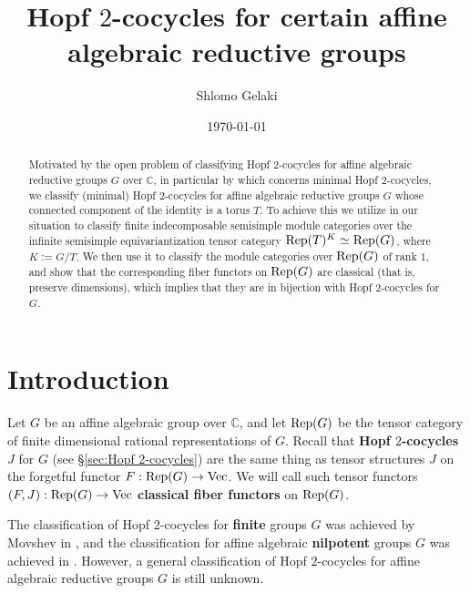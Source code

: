 \documentclass{amsart}
\theoremstyle{definition}
\newcommand{\Rep}{{\rm Rep}}
\newcommand{\Vect}{{\rm Vec}}
\numberwithin{equation}{section}
\begin{document}
\title[Hopf $2$-cocycles for certain affine algebraic reductive groups] {Hopf $2$-cocycles for certain affine algebraic reductive groups}

\author{Shlomo Gelaki}
\address{Department of Mathematics, Iowa State University, Ames, IA 50011, USA} 

\date{\today}


\begin{abstract}
Motivated by the open problem of classifying Hopf $2$-cocycles for affine algebraic reductive groups $G$ over $\mathbb{C}$, in particular by \cite[Question 7.2]{EG1} which concerns minimal Hopf $2$-cocycles, we classify (minimal) Hopf $2$-cocycles for affine algebraic reductive groups $G$ whose connected component of the identity is a torus $T$. To achieve this we utilize \cite[Proposition 5.4]{ENO} in our situation to classify finite indecomposable semisimple module categories over the infinite semisimple equivariantization tensor category $\Rep(T)^K\simeq \Rep(G)$, where $K:=G/T$. We then use it to classify the module categories over $\Rep(G)$ of rank $1$, and show that the corresponding fiber functors on $\Rep(G)$ are classical (that is, preserve dimensions), which implies that they are in bijection with Hopf $2$-cocycles for $G$.
\end{abstract}

\maketitle

\tableofcontents

\section{Introduction}\label{sec:Introduction}
Let $G$ be an affine algebraic group over $\mathbb{C}$, and let $\Rep(G)$ be the tensor category of finite dimensional rational representations of $G$. Recall that {\bf Hopf $2$-cocycles} $J$ for $G$ (see \S\ref{sec:Hopf 2-cocycles}) are the same thing as tensor structures $J$ on the forgetful functor $F:\Rep(G)\to \Vect$. We will call such tensor functors $(F,J):\Rep(G)\to \Vect$ {\bf classical fiber functors} on $\Rep(G)$.

The classification of Hopf $2$-cocycles for {\bf finite} groups $G$ was achieved by Movshev in 
\cite{Mo}, and the classification for affine algebraic {\bf nilpotent} groups $G$ was achieved in \cite{EG1,EG2,G}. However, a general classification of Hopf $2$-cocycles for affine algebraic reductive groups $G$ is still unknown.
\end{document}
